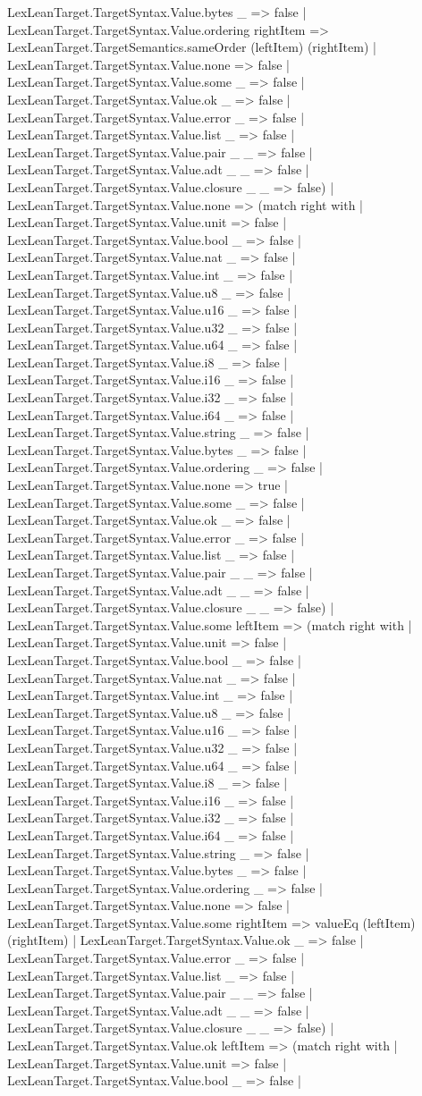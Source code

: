 \documentclass[11pt]{article}
\begin{document}
LexLeanTarget.TargetSyntax.Value.bytes \_ => false | LexLeanTarget.TargetSyntax.Value.ordering rightItem => LexLeanTarget.TargetSemantics.sameOrder (leftItem) (rightItem) | LexLeanTarget.TargetSyntax.Value.none => false | LexLeanTarget.TargetSyntax.Value.some \_ => false | LexLeanTarget.TargetSyntax.Value.ok \_ => false | LexLeanTarget.TargetSyntax.Value.error \_ => false | LexLeanTarget.TargetSyntax.Value.list \_ => false | LexLeanTarget.TargetSyntax.Value.pair \_ \_ => false | LexLeanTarget.TargetSyntax.Value.adt \_ \_ => false | LexLeanTarget.TargetSyntax.Value.closure \_ \_ => false) | LexLeanTarget.TargetSyntax.Value.none => (match right with | LexLeanTarget.TargetSyntax.Value.unit => false | LexLeanTarget.TargetSyntax.Value.bool \_ => false | LexLeanTarget.TargetSyntax.Value.nat \_ => false | LexLeanTarget.TargetSyntax.Value.int \_ => false | LexLeanTarget.TargetSyntax.Value.u8 \_ => false | LexLeanTarget.TargetSyntax.Value.u16 \_ => false | LexLeanTarget.TargetSyntax.Value.u32 \_ => false | LexLeanTarget.TargetSyntax.Value.u64 \_ => false | LexLeanTarget.TargetSyntax.Value.i8 \_ => false | LexLeanTarget.TargetSyntax.Value.i16 \_ => false | LexLeanTarget.TargetSyntax.Value.i32 \_ => false | LexLeanTarget.TargetSyntax.Value.i64 \_ => false | LexLeanTarget.TargetSyntax.Value.string \_ => false | LexLeanTarget.TargetSyntax.Value.bytes \_ => false | LexLeanTarget.TargetSyntax.Value.ordering \_ => false | LexLeanTarget.TargetSyntax.Value.none => true | LexLeanTarget.TargetSyntax.Value.some \_ => false | LexLeanTarget.TargetSyntax.Value.ok \_ => false | LexLeanTarget.TargetSyntax.Value.error \_ => false | LexLeanTarget.TargetSyntax.Value.list \_ => false | LexLeanTarget.TargetSyntax.Value.pair \_ \_ => false | LexLeanTarget.TargetSyntax.Value.adt \_ \_ => false | LexLeanTarget.TargetSyntax.Value.closure \_ \_ => false) | LexLeanTarget.TargetSyntax.Value.some leftItem => (match right with | LexLeanTarget.TargetSyntax.Value.unit => false | LexLeanTarget.TargetSyntax.Value.bool \_ => false | LexLeanTarget.TargetSyntax.Value.nat \_ => false | LexLeanTarget.TargetSyntax.Value.int \_ => false | LexLeanTarget.TargetSyntax.Value.u8 \_ => false | LexLeanTarget.TargetSyntax.Value.u16 \_ => false | LexLeanTarget.TargetSyntax.Value.u32 \_ => false | LexLeanTarget.TargetSyntax.Value.u64 \_ => false | LexLeanTarget.TargetSyntax.Value.i8 \_ => false | LexLeanTarget.TargetSyntax.Value.i16 \_ => false | LexLeanTarget.TargetSyntax.Value.i32 \_ => false | LexLeanTarget.TargetSyntax.Value.i64 \_ => false | LexLeanTarget.TargetSyntax.Value.string \_ => false | LexLeanTarget.TargetSyntax.Value.bytes \_ => false | LexLeanTarget.TargetSyntax.Value.ordering \_ => false | LexLeanTarget.TargetSyntax.Value.none => false | LexLeanTarget.TargetSyntax.Value.some rightItem => valueEq (leftItem) (rightItem) | LexLeanTarget.TargetSyntax.Value.ok \_ => false | LexLeanTarget.TargetSyntax.Value.error \_ => false | LexLeanTarget.TargetSyntax.Value.list \_ => false | LexLeanTarget.TargetSyntax.Value.pair \_ \_ => false | LexLeanTarget.TargetSyntax.Value.adt \_ \_ => false | LexLeanTarget.TargetSyntax.Value.closure \_ \_ => false) | LexLeanTarget.TargetSyntax.Value.ok leftItem => (match right with | LexLeanTarget.TargetSyntax.Value.unit => false | LexLeanTarget.TargetSyntax.Value.bool \_ => false | 
\end{document}
